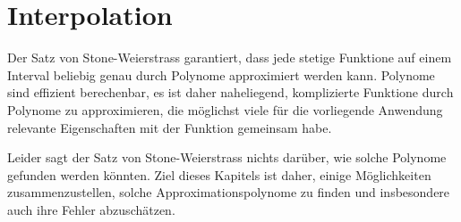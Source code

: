 %
%
%
\chapter{Interpolation\label{chapter:interpolation}}
\rhead{}
Der Satz von Stone-Weierstrass garantiert, dass jede stetige Funktione
auf einem Interval beliebig genau durch Polynome approximiert werden
kann.
Polynome sind effizient berechenbar, es ist daher naheliegend,
komplizierte Funktione durch Polynome zu approximieren, die möglichst
viele für die vorliegende Anwendung relevante Eigenschaften mit der
Funktion gemeinsam habe.

Leider sagt der Satz von Stone-Weierstrass nichts darüber, wie solche
Polynome gefunden werden könnten.
Ziel dieses Kapitels ist daher, einige Möglichkeiten zusammenzustellen,
solche Approximationspolynome zu finden und insbesondere auch ihre
Fehler abzuschätzen.










